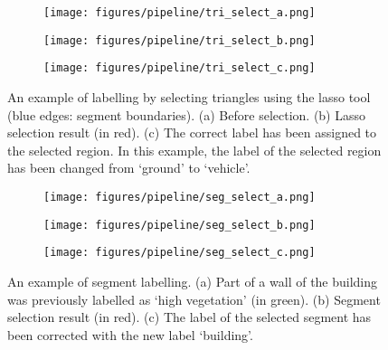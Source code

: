 \begin{figure}[!tb]
	\centering
	\begin{subfigure}[t]{0.32\textwidth}
		\texttt{[image: figures/pipeline/tri\_select\_a.png]}
		\caption{}
	\end{subfigure}
	\hspace*{\fill}
	\begin{subfigure}[t]{0.32\textwidth}
		\texttt{[image: figures/pipeline/tri\_select\_b.png]}
		\caption{}
	\end{subfigure}
	\hspace*{\fill}
	\begin{subfigure}[t]{0.32\textwidth}
		\texttt{[image: figures/pipeline/tri\_select\_c.png]}
		\caption{}
	\end{subfigure}
	\caption{An example of labelling by selecting triangles using the lasso tool (blue edges: segment boundaries). 
		(a) Before selection.
		(b) Lasso selection result (in red).
		(c) The correct label has been assigned to the selected region. 
		In this example, the label of the selected region has been changed from `ground' to `vehicle'.
	} 
	\label{fig:tri_sel}
\end{figure}


\begin{figure}[!tb]
	\centering
	\begin{subfigure}[t]{0.32\textwidth}
		\texttt{[image: figures/pipeline/seg\_select\_a.png]}
		\caption{}
	\end{subfigure}
	\hspace*{\fill}
	\begin{subfigure}[t]{0.32\textwidth}
		\texttt{[image: figures/pipeline/seg\_select\_b.png]}
		\caption{}
	\end{subfigure}
	\hspace*{\fill}
	\begin{subfigure}[t]{0.32\textwidth}
		\texttt{[image: figures/pipeline/seg\_select\_c.png]}
		\caption{}
	\end{subfigure}
	\caption{An example of segment labelling. 
		(a) Part of a wall of the building was previously labelled as `high vegetation' (in green).
		(b) Segment selection result (in red).
		(c) The label of the selected segment has been corrected with the new label `building'.
	}
	\label{fig:seg_sel}
\end{figure}

